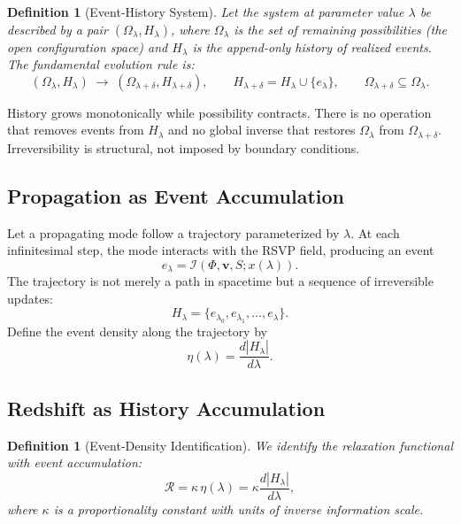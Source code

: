 \documentclass[12pt,a4paper]{article}
\newtheorem{definition}[theorem]{Definition}
\theoremstyle{remark}
\newcommand{\vv}{\mathbf{v}}
\newcommand{\Rcal}{\mathcal{R}}
\begin{document}
\begin{definition}[Event-History System]
Let the system at parameter value $\lambda$ be described by a pair $(\Omega_\lambda, H_\lambda)$, where $\Omega_\lambda$ is the set of remaining possibilities (the open configuration space) and $H_\lambda$ is the append-only history of realized events. The fundamental evolution rule is:
\begin{equation}
(\Omega_\lambda, H_\lambda) \;\longrightarrow\; (\Omega_{\lambda+\delta}, H_{\lambda+\delta}),
\qquad
H_{\lambda+\delta} = H_\lambda \cup \{e_\lambda\},
\qquad
\Omega_{\lambda+\delta} \subseteq \Omega_\lambda.
\end{equation}
\end{definition}
History grows monotonically while possibility contracts. There is no operation that removes events from $H_\lambda$ and no global inverse that restores $\Omega_\lambda$ from $\Omega_{\lambda+\delta}$. Irreversibility is structural, not imposed by boundary conditions.

\subsection{Propagation as Event Accumulation}

Let a propagating mode follow a trajectory parameterized by $\lambda$. At each infinitesimal step, the mode interacts with the RSVP field, producing an event
\begin{equation}
e_\lambda = \mathcal{I}(\Phi, \vv, S; x(\lambda)).
\end{equation}
The trajectory is not merely a path in spacetime but a sequence of irreversible updates:
\begin{equation}
H_\lambda = \{e_{\lambda_0}, e_{\lambda_1}, \ldots, e_\lambda\}.
\end{equation}
Define the event density along the trajectory by
\begin{equation}
\eta(\lambda) = \frac{d|H_\lambda|}{d\lambda}.
\end{equation}

\subsection{Redshift as History Accumulation}

\begin{definition}[Event-Density Identification]
We identify the relaxation functional with event accumulation:
\begin{equation}
\boxed{\Rcal = \kappa\,\eta(\lambda) = \kappa\frac{d|H_\lambda|}{d\lambda},}
\label{eq:R_spherepop}
\end{equation}
where $\kappa$ is a proportionality constant with units of inverse information scale.
\end{definition}
\end{document}
